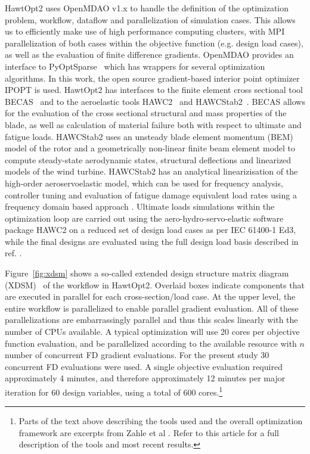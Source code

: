 HawtOpt2 uses OpenMDAO v1.x \cite{openmdao} to handle the definition of the optimization problem, workflow, dataflow and parallelization of simulation cases.
This allows us to efficiently make use of high performance computing clusters, with MPI parallelization of both cases within the objective function (e.g. design load cases), as well as the evaluation of finite difference gradients.
OpenMDAO provides an interface to PyOptSparse~\cite{pyopt} which has wrappers for several optimization algorithms.
In this work, the open source gradient-based interior point optimizer IPOPT \cite{ipopt} is used. 
HawtOpt2 has interfaces to the finite element cross sectional tool BECAS~\cite{blasquesb, becas} and to the aeroelastic tools HAWC2~\cite{hawc2_manual} and HAWCStab2~\cite{hansen_aeroelastic_2004}. 
BECAS allows for the evaluation of the cross sectional structural and mass properties of the blade, as well as calculation of material failure both with respect to ultimate and fatigue loads.
HAWCStab2 uses an unsteady blade element momentum (BEM) model of the rotor and a geometrically non-linear finite beam element model to compute steady-state aerodynamic states, structural deflections and linearized models of the wind turbine. 
HAWCStab2 has an analytical linearizisation of the high-order aeroservoelastic model, which can be used for frequency analysis, controller tuning and evaluation of fatigue damage equivalent load rates using a frequency domain based approach \cite{tibaldi2015}. 
Ultimate loads simulations within the optimization loop are carried out using the aero-hydro-servo-elastic software package HAWC2 on a reduced set of design load cases as per IEC 61400-1 Ed3, while the final designs are evaluated using the full design load basis described in ref. \cite{hansen2015}.

Figure~\ref{fig:xdsm} shows a so-called extended design structure matrix diagram (XDSM)~\cite{Lambe2012} of the workflow in HawtOpt2.
Overlaid boxes indicate components that are executed in parallel for each cross-section/load case.
At the upper level, the entire workflow is parallelized to enable parallel gradient evaluation.
All of these parallelizations are embarrassingly parallel and thus this scales linearly with the number of CPUs available.
A typical optimization will use 20 cores per objective function evaluation, and be parallelized according to the available resource with $n$ number of concurrent FD gradient evaluations.
For the present study 30 concurrent FD evaluations were used. A single objective evaluation required approximately 4 minutes, and therefore approximately 12 minutes per major iteration for 60 design variables, using a total of 600 cores.\footnote{Parts of the text above describing the tools used and the overall optimization framework are excerpts from Zahle et al \cite{zahle2016}. Refer to this article for a full description of the tools and most recent results.}

